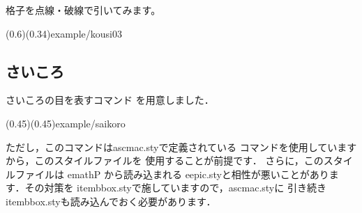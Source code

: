格子を点線・破線で引いてみます。

\showexample[格子線を破線で引く](0.6)(0.34){example/kousi03}



\subsection{さいころ}
さいころの目を表すコマンド  を用意しました．

\showexample[さいころ](0.45)(0.45){example/saikoro}

ただし，このコマンドは\textsf{ascmac.sty}で定義されている
コマンドを使用していますから，このスタイルファイルを
使用することが前提です．
さらに，このスタイルファイルは \textsf{emathP} から読み込まれる
\textsf{eepic.sty}と相性が悪いことがあります．その対策を
\textsf{itembbox.sty}で施していますので，\textsf{ascmac.sty}に
引き続き \textsf{itembbox.sty}も読み込んでおく必要があります．
